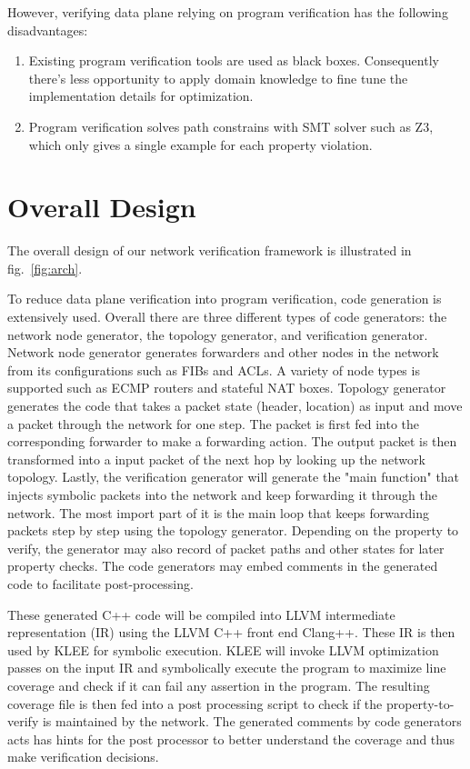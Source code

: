 \documentclass[letterpaper, 10 pt, conference]{ieeeconf}  %
\begin{document}
However, verifying data plane relying on program verification has the following disadvantages:

\begin{enumerate}
 \item Existing program verification tools are used as black boxes. Consequently there's less opportunity to apply domain knowledge to fine tune the implementation details for optimization.
 \item Program verification solves path constrains with SMT solver such as Z3, which only gives a single example for each property violation.
\end{enumerate}

\section{Overall Design}\label{sec:overall}
The overall design of our network verification framework is illustrated in fig.~\ref{fig:arch}. 

To reduce data plane verification into program verification, code generation is extensively used. Overall there are three different types of code generators: the network node generator, the topology generator, and verification generator. Network node generator generates forwarders and other nodes in the network from its configurations such as FIBs and ACLs. A variety of node types is supported such as ECMP routers and stateful NAT boxes. Topology generator generates the code that takes a packet state (header, location) as input and move a packet through the network for one step. The packet is first fed into the corresponding forwarder to make a forwarding action. The output packet is then transformed into a input packet of the next hop by looking up the network topology. Lastly, the verification generator will generate the "main function" that injects symbolic packets into the network and keep forwarding it through the network. The most import part of it is the main loop that keeps forwarding packets step by step using the topology generator. Depending on the property to verify, the generator may also record of packet paths and other states for later property checks. The code generators may embed comments in the generated code to facilitate post-processing.

These generated C++ code will be compiled into LLVM intermediate representation (IR) using the LLVM C++ front end Clang++. These IR is then used by KLEE for symbolic execution. KLEE will invoke LLVM optimization passes on the input IR and symbolically execute the program to maximize line coverage and check if it can fail any assertion in the program. The resulting coverage file is then fed into a post processing script to check if the property-to-verify is maintained by the network. The generated comments by code generators acts has hints for the post processor to better understand the coverage and thus make verification decisions.
\end{document}
